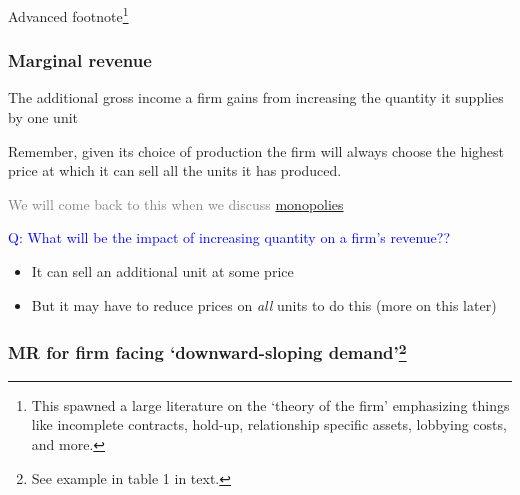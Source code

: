\documentclass[]{article}
\providecommand{\tightlist}{%
  \setlength{\itemsep}{0pt}\setlength{\parskip}{0pt}}
\begin{document}
\textcolor{RawSienna}{Advanced footnote}\footnote{This spawned a large
  literature on the `theory of the firm' emphasizing things like
  incomplete contracts, hold-up, relationship specific assets, lobbying
  costs, and more.}

\hypertarget{marginal-revenue}{%
\subsubsection{Marginal revenue}\label{marginal-revenue}}

\begin{description}
\tightlist
\item[Marginal revenue]
The additional gross income a firm gains from increasing the quantity it
supplies by one unit
\end{description}

Remember, given its choice of production the firm will always choose the
highest price at which it can sell all the units it has produced.

\textcolor{gray}{We will come back to this when we discuss}
\protect\hyperlink{monopolies-pd}{monopolies}

\bigskip

\textcolor{blue}{Q: What will be the impact of increasing quantity on a firm's revenue??}

\bigskip

\begin{itemize}
\tightlist
\item
  It can sell an additional unit at some price
\item
  But it may have to reduce prices on \emph{all} units to do this (more
  on this later)
\end{itemize}

\hypertarget{mr-for-firm-facing-downward-sloping-demand}{%
\subsubsection[MR for firm facing `downward-sloping
demand']{\texorpdfstring{MR for firm facing `downward-sloping
demand'\footnote{See example in table 1 in text.}}{MR for firm facing `downward-sloping demand'}}\label{mr-for-firm-facing-downward-sloping-demand}}
\end{document}
